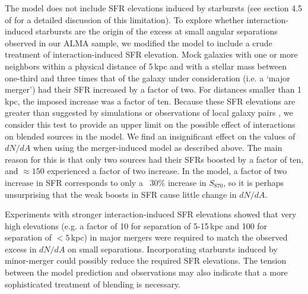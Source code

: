 \documentclass[iop]{emulateapj}
\begin{document}

The \citet{HB13} model does not include SFR elevations induced by starbursts
(see section 4.5 of \citealt{HB13} for a detailed discussion of this
limitation). To explore whether interaction-induced starbursts are the origin
of the excess at small angular separations observed in our ALMA sample, we
modified the \citet{HB13} model to include a crude treatment of
interaction-induced SFR elevation. Mock galaxies with one or more neighbors
within a physical distance of 5$\,$kpc and with a stellar mass between
one-third and three times that of the galaxy under consideration (i.e.  a
`major merger') had their SFR increased by a factor of two. For distances
smaller than 1$\,$kpc, the imposed increase was a factor of ten.  Because these
SFR elevations are greater than suggested by simulations \citep[e.g.][]{Cox08,
H11, H14, Torrey12} or observations of local galaxy pairs
\citep[e.g.][]{Scudder12, Patton13}, we consider this test to provide an upper
limit on the possible effect of interactions on blended sources in the
\citet{HB13} model.  We find an insignificant effect on the values of $dN/dA$
when using the merger-induced model as described above.  The main reason for
this is that only two sources had their SFRs boosted by a factor of ten, and
$\approx150$ experienced a factor of two increase. In the \citet{HB13} model, a
factor of two increase in SFR corresponds to only a ~30\% increase in
$S_{870}$, so it is perhaps unsurprising that the weak boosts in SFR cause
little change in $dN/dA$.

Experiments with stronger interaction-induced SFR elevations showed that very
high elevations (e.g. a factor of 10 for separation of 5-15$\,$kpc and 100 for
separation of $<5\,$kpc) in major mergers were required to match the observed
excess in $dN/dA$ on small separations. Incorporating starbursts induced by minor-merger could possibly reduce the required SFR elevations. The tension
between the model prediction and observations may also indicate that a more
sophisticated treatment of blending is necessary.
\end{document}

